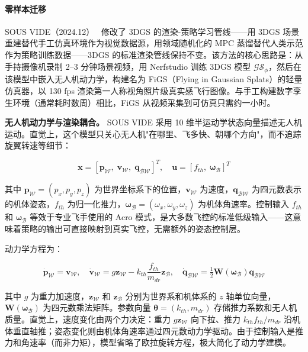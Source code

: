 \paragraph{零样本迁移}

SOUS VIDE（2024.12）~\cite{2412_16346} 修改了 3DGS 的渲染-策略学习管线——用 3DGS 场景重建替代手工仿真环境作为视觉数据源，用领域随机化的 MPC 蒸馏替代人类示范作为策略训练数据——3DGS 的标准渲染管线保持不变。该方法的核心思路是：从手持摄像机录制 2--3 分钟场景视频，用 Nerfstudio 训练 3DGS 模型 $\mathcal{GS}_\phi$，然后在该模型中嵌入无人机动力学，构建名为 FiGS（Flying in Gaussian Splats）的轻量仿真器，以 130 fps 渲染第一人称视角照片级真实感飞行图像。与手工构建数字孪生环境（通常耗时数周）相比，FiGS 从视频采集到可仿真只需约一小时。

\textbf{无人机动力学与渲染耦合。}
SOUS VIDE 采用 10 维半运动学状态向量描述无人机运动。直觉上，这个模型只关心无人机"在哪里、飞多快、朝哪个方向"，而不追踪旋翼转速等细节：

\begin{equation}
\bm{x} = [\bm{p}_\mathcal{W},\; \bm{v}_\mathcal{W},\; \bm{q}_{\mathcal{BW}}]^T, \quad
\bm{u} = [f_{th},\; \bm{\omega}_\mathcal{B}]^T
\end{equation}

其中 $\bm{p}_\mathcal{W}=(p_x, p_y, p_z)$ 为世界坐标系下的位置，$\bm{v}_\mathcal{W}$ 为速度，$\bm{q}_{\mathcal{BW}}$ 为四元数表示的机体姿态，$f_{th}$ 为归一化推力，$\bm{\omega}_\mathcal{B}=(\omega_x, \omega_y, \omega_z)$ 为机体角速率。控制输入 $f_{th}$ 和 $\bm{\omega}_\mathcal{B}$ 等效于专业飞手使用的 Acro 模式，是大多数飞控的标准低级输入——这意味着策略的输出可直接映射到真实飞控，无需额外的姿态控制层。

动力学方程为：

\begin{equation}
\dot{\bm{p}}_\mathcal{W} = \bm{v}_\mathcal{W}, \quad
\dot{\bm{v}}_\mathcal{W} = g\bm{z}_\mathcal{W} - k_{th}\frac{f_{th}}{m_{dr}}\bm{z}_\mathcal{B}, \quad
\dot{\bm{q}}_{\mathcal{BW}} = \tfrac{1}{2}\bm{W}(\bm{\omega}_\mathcal{B})\bm{q}_{\mathcal{BW}}
\end{equation}

其中 $g$ 为重力加速度，$\bm{z}_\mathcal{W}$ 和 $\bm{z}_\mathcal{B}$ 分别为世界系和机体系的 $z$ 轴单位向量，$\bm{W}(\bm{\omega}_\mathcal{B})$ 为四元数乘法矩阵。参数向量 $\bm{\theta}=(k_{th}, m_{dr})$ 存储推力系数和无人机质量。直觉上，速度变化由两个力决定：重力 $g\bm{z}_\mathcal{W}$ 向下拉、推力 $k_{th}f_{th}/m_{dr}$ 沿机体垂直轴推；姿态变化则由机体角速率通过四元数动力学驱动。由于控制输入是推力和角速率（而非力矩），模型省略了欧拉旋转方程，极大简化了动力学建模。

